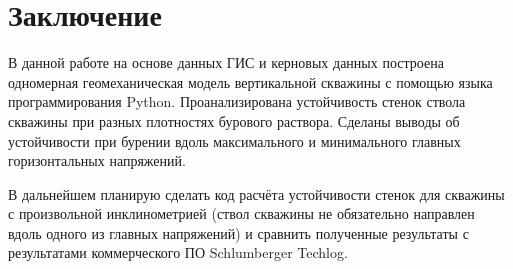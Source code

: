 \chapter*{Заключение} \label{ch-conclusion}

В данной работе на основе данных ГИС и керновых данных построена одномерная геомеханическая модель вертикальной скважины с помощью языка программирования Python.
Проанализирована устойчивость стенок ствола скважины при разных плотностях бурового раствора.
Сделаны выводы об устойчивости при бурении вдоль максимального и минимального главных горизонтальных напряжений.

В дальнейшем планирую сделать код расчёта устойчивости стенок для скважины с произвольной инклинометрией (ствол скважины не обязательно направлен вдоль одного из главных напряжений) и сравнить полученные результаты с результатами коммерческого ПО Schlumberger Techlog.
